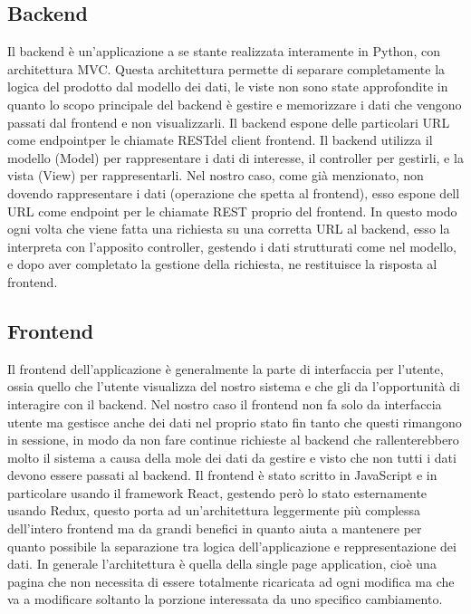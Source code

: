 \subsection{Backend}
Il backend è un'applicazione a se stante realizzata interamente in Python, con architettura \gls{MVC}\glsfirstoccur. Questa architettura permette di separare completamente
la logica del prodotto dal modello dei dati, le viste non sono state approfondite in quanto lo scopo principale del backend è gestire e memorizzare i dati che vengono passati
dal frontend e non visualizzarli. Il backend espone delle particolari URL come \gls{endpoint}\glsfirstoccur per le chiamate \gls{REST}\glsfirstoccur del client frontend.
Il backend utilizza il modello (Model) per rappresentare i dati di interesse, il controller per gestirli, e la vista (View) per rappresentarli. Nel nostro caso, come già menzionato,
non dovendo rappresentare i dati (operazione che spetta al frontend), esso espone dell URL come endpoint per le chiamate REST proprio del frontend. In questo modo ogni volta che viene fatta
una richiesta su una corretta URL al backend, esso la interpreta con l'apposito controller, gestendo i dati strutturati come nel modello, e dopo aver completato la gestione
della richiesta, ne restituisce la risposta al frontend.

\subsection{Frontend}
Il frontend dell'applicazione è generalmente la parte di interfaccia per l'utente, ossia quello che l'utente visualizza del nostro sistema e che gli da l'opportunità di interagire
con il backend. Nel nostro caso il frontend non fa solo da interfaccia utente ma gestisce anche dei dati nel proprio stato fin tanto che questi rimangono in \gls{sessione}\glsfirstoccur, in modo da
non fare continue richieste al backend che rallenterebbero molto il sistema a causa della mole dei dati da gestire e visto che non tutti i dati devono essere passati al backend.
Il frontend è stato scritto in JavaScript e in particolare usando il framework React, gestendo però lo stato esternamente usando Redux, questo porta ad un'architettura leggermente
più complessa dell'intero frontend ma da grandi benefici in quanto aiuta a mantenere per quanto possibile la separazione tra logica dell'applicazione e reppresentazione dei dati.
In generale l'architettura è quella della single page application, cioè una pagina che non necessita di essere totalmente ricaricata ad ogni modifica ma che va a modificare
soltanto la porzione interessata da uno specifico cambiamento.

